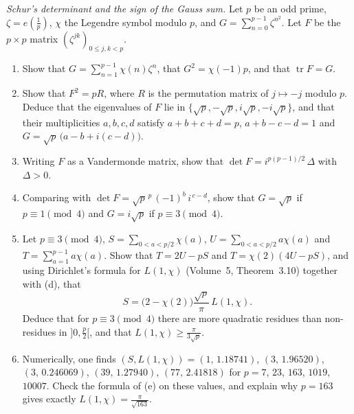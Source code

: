 \begin{exercise}[Journey]\label{pb:schur}
\emph{Schur's determinant and the sign of the Gauss sum.} Let $p$ be an odd prime, $\zeta=e(\frac1p)$, $\chi$ the Legendre symbol modulo $p$, and
$G=\sum_{n=0}^{p-1}\zeta^{n^2}$. Let $F$ be the $p\times p$ matrix $(\zeta^{jk})_{0\le j,k<p}$.
\begin{enumerate}[label=(\alph*)]
\item Show that $G=\sum_{n=1}^{p-1}\chi(n)\zeta^n$, that $G^2=\chi(-1)p$, and that $\operatorname{tr}F=G$.
\item Show that $F^2=pR$, where $R$ is the permutation matrix of $j\mapsto-j$ modulo $p$. Deduce that the eigenvalues of $F$ lie in $\{\sqrt p,-\sqrt p,i\sqrt p,-i\sqrt p\}$,
and that their multiplicities $a,b,c,d$ satisfy $a+b+c+d=p$, $a+b-c-d=1$ and $G=\sqrt p\,\bigl(a-b+i(c-d)\bigr)$.
\item Writing $F$ as a Vandermonde matrix, show that $\det F=i^{p(p-1)/2}\,\Delta$ with $\Delta>0$.
\item Comparing with $\det F=\sqrt p^{\,p}\,(-1)^b\,i^{\,c-d}$, show that $G=\sqrt p$ if $p\equiv1\pmod4$ and $G=i\sqrt p$ if $p\equiv3\pmod4$.
\item Let $p\equiv3\pmod4$, $S=\sum_{0<a<p/2}\chi(a)$, $U=\sum_{0<a<p/2}a\chi(a)$ and $T=\sum_{a=1}^{p-1}a\chi(a)$. Show that $T=2U-pS$ and $T=\chi(2)(4U-pS)$, and
using Dirichlet's formula for $L(1,\chi)$ (Volume~5, Theorem~3.10) together with (d), that
\[
S=\bigl(2-\chi(2)\bigr)\frac{\sqrt p}\pi\,L(1,\chi).
\]
Deduce that for $p\equiv3\pmod4$ there are more quadratic residues than non-residues in $]0,\frac p2[$, and that $L(1,\chi)\ge\frac\pi{3\sqrt p}$.
\item Numerically, one finds $(S,L(1,\chi))=(1,\,1.18741)$, $(3,\,1.96520)$, $(3,\,0.246069)$, $(39,\,1.27940)$, $(77,\,2.41818)$ for $p=7$, $23$, $163$, $1019$, $10007$.
Check the formula of (e) on these values, and explain why $p=163$ gives exactly $L(1,\chi)=\frac\pi{\sqrt{163}}$.
\end{enumerate}
\end{exercise}

